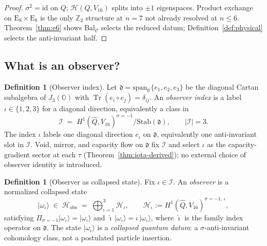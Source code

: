 \documentclass[11pt]{article}
\theoremstyle{plain}
\theoremstyle{definition}
\newtheorem{definition}[theorem]{Definition}
\theoremstyle{remark}
\numberwithin{equation}{section}
\newcommand{\R}{\mathbb{R}}
\newcommand{\jalg}{J_3(\mathbb{O})}
\newcommand{\E}[1]{\mathrm{E}_{#1}}
\newcommand{\Tr}{\operatorname{Tr}}
\begin{document}
\begin{proof}
$\sigma^2=\mathrm{id}$ on $Q$; $\mathcal{H}(Q,V_{16})$ splits into
$\pm1$ eigenspaces. Product exchange on $\E{8}\times\E{8}$ is the only
$\mathbb{Z}_2$ structure at $n=7$ not already resolved at $n\leq6$.
Theorem~\ref{thm:e6} shows $\mathrm{Bal}_{\mathcal{C}}$ selects the reduced
datum; Definition~\ref{def:physical} selects the anti-invariant half.
\end{proof}

\subsection{What is an observer?}
\label{sec:observer:definition}

\begin{definition}[Observer index]\label{def:observer-index}
Let $\mathfrak{d}=\mathrm{span}_\R\{e_1,e_2,e_3\}$ be the diagonal Cartan
subalgebra of $\jalg$ with $\Tr(e_i\circ e_j)=\delta_{ij}$.
An \emph{observer index} is a label $\iota\in\{1,2,3\}$ for a diagonal direction,
equivalently a class in
\begin{equation}\label{eq:observer-index}
  \mathcal{I} \;=\; H^1(\hat Q,V_{16})^{\sigma=-1}/\mathrm{Stab}(\mathfrak{d}),
  \qquad |\mathcal{I}|=3.
\end{equation}
The index $\iota$ labels one diagonal direction $e_\iota$ on $\mathfrak{d}$,
equivalently one anti-invariant slot in $\mathcal{I}$. Void, mirror, and
capacity flow on $\mathfrak{d}$ fix $\mathcal{I}$ and select $\iota$ as the
capacity-gradient sector at each $\tau$ (Theorem~\ref{thm:iota-derived}); no
external choice of observer identity is introduced.
\end{definition}

\begin{definition}[Observer as collapsed state]\label{def:observer}
Fix $\iota\in\mathcal{I}$. An \emph{observer} is a normalized collapsed state
\begin{equation}\label{eq:observer-state}
  |\omega_\iota\rangle \;\in\; \mathcal{H}_{\mathrm{obs}}
  \;=\; \bigoplus_{\iota=1}^3 \mathcal{H}_\iota,
  \qquad
  \mathcal{H}_\iota := H^1(\hat Q,V_{16})^{\sigma=-1,\,\iota},
\end{equation}
satisfying $\Pi_{\sigma=-1}|\omega_\iota\rangle=|\omega_\iota\rangle$ and
$\hat{\imath}\,|\omega_\iota\rangle=\iota\,|\omega_\iota\rangle$, where
$\hat{\imath}$ is the family index operator on $\mathfrak{d}$.
The state $|\omega_\iota\rangle$ is a \emph{collapsed quantum datum}: a
$\sigma$-anti-invariant cohomology class, not a postulated particle insertion.
\end{definition}
\end{document}

